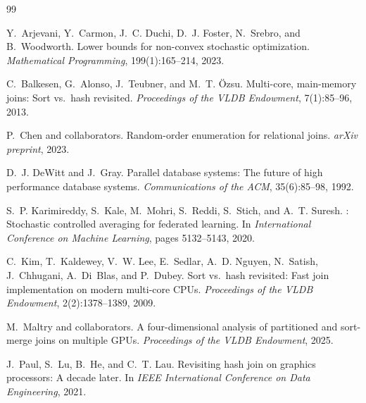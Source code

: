 \documentclass{article}
\begin{document}
\begin{thebibliography}{99}

Y.~Arjevani, Y.~Carmon, J.~C. Duchi, D.~J. Foster, N.~Srebro, and B.~Woodworth.
\newblock Lower bounds for non-convex stochastic optimization.
\newblock \emph{Mathematical Programming}, 199(1):165--214, 2023.

C.~Balkesen, G.~Alonso, J.~Teubner, and M.~T. \"Ozsu.
\newblock Multi-core, main-memory joins: Sort vs.\ hash revisited.
\newblock \emph{Proceedings of the VLDB Endowment}, 7(1):85--96, 2013.

P.~Chen and collaborators.
\newblock Random-order enumeration for relational joins.
\newblock \emph{arXiv preprint}, 2023.

D.~J. DeWitt and J.~Gray.
\newblock Parallel database systems: The future of high performance database
systems.
\newblock \emph{Communications of the ACM}, 35(6):85--98, 1992.

S.~P. Karimireddy, S.~Kale, M.~Mohri, S.~Reddi, S.~Stich, and A.~T. Suresh.
: Stochastic controlled averaging for federated learning.
\newblock In \emph{International Conference on Machine Learning}, pages
5132--5143, 2020.

C.~Kim, T.~Kaldewey, V.~W. Lee, E.~Sedlar, A.~D. Nguyen, N.~Satish,
J.~Chhugani, A.~Di~Blas, and P.~Dubey.
\newblock Sort vs.\ hash revisited: Fast join implementation on modern
multi-core {CPU}s.
\newblock \emph{Proceedings of the VLDB Endowment}, 2(2):1378--1389, 2009.

M.~Maltry and collaborators.
\newblock A four-dimensional analysis of partitioned and sort-merge joins on
multiple {GPU}s.
\newblock \emph{Proceedings of the VLDB Endowment}, 2025.

J.~Paul, S.~Lu, B.~He, and C.~T. Lau.
\newblock Revisiting hash join on graphics processors: A decade later.
\newblock In \emph{IEEE International Conference on Data Engineering}, 2021.


\end{thebibliography}
\end{document}
